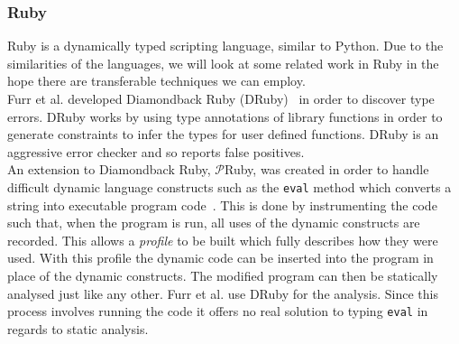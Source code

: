 \documentclass[12pt, titlepage]{article}
\begin{document}
\subsubsection{Ruby}
Ruby is a dynamically typed scripting language, similar to Python. Due to the similarities of the languages, we will look at some related work in Ruby in the hope there are transferable techniques we can employ. \\
\indent Furr et al. developed Diamondback Ruby (DRuby)~\cite{furr09} in order to discover type errors. DRuby works by using type annotations of library functions in order to generate constraints to infer the types for user defined functions. DRuby is an aggressive error checker and so reports false positives. \\
\indent An extension to Diamondback Ruby, $\mathcal{P}$Ruby, was created in order to handle difficult dynamic language constructs such as the \texttt{eval} method which converts a string into executable program code~\cite{pRuby}. This is done by instrumenting the code such that, when the program is run, all uses of the dynamic constructs are recorded. This allows a \textit{profile} to be built which fully describes how they were used. With this profile the dynamic code can be inserted into the program in place of the dynamic constructs. The modified program can then be statically analysed just like any other. Furr et al. use DRuby for the analysis. Since this process involves running the code it offers no real solution to typing \texttt{eval} in regards to static analysis.





\newpage
\end{document}
